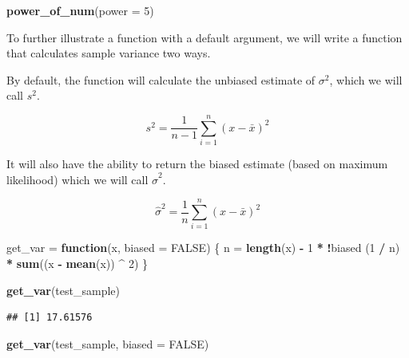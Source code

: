 \documentclass[]{book}
\newenvironment{Shaded}{\begin{snugshade}}{\end{snugshade}}
\newcommand{\KeywordTok}[1]{\textcolor[rgb]{0.13,0.29,0.53}{\textbf{#1}}}
\newcommand{\DataTypeTok}[1]{\textcolor[rgb]{0.13,0.29,0.53}{#1}}
\newcommand{\DecValTok}[1]{\textcolor[rgb]{0.00,0.00,0.81}{#1}}
\newcommand{\StringTok}[1]{\textcolor[rgb]{0.31,0.60,0.02}{#1}}
\newcommand{\OtherTok}[1]{\textcolor[rgb]{0.56,0.35,0.01}{#1}}
\newcommand{\ControlFlowTok}[1]{\textcolor[rgb]{0.13,0.29,0.53}{\textbf{#1}}}
\newcommand{\OperatorTok}[1]{\textcolor[rgb]{0.81,0.36,0.00}{\textbf{#1}}}
\newcommand{\NormalTok}[1]{#1}
\theoremstyle{definition}
\theoremstyle{definition}
\theoremstyle{definition}
\theoremstyle{remark}
\begin{document}
\begin{Shaded}
\begin{Highlighting}[]
\KeywordTok{power_of_num}\NormalTok{(}\DataTypeTok{power =} \DecValTok{5}\NormalTok{)}
\end{Highlighting}
\end{Shaded}

To further illustrate a function with a default argument, we will write
a function that calculates sample variance two ways.

By default, the function will calculate the unbiased estimate of
\(\sigma^2\), which we will call \(s^2\).

\[
s^2 = \frac{1}{n - 1}\sum_{i=1}^{n}(x - \bar{x})^2
\]

It will also have the ability to return the biased estimate (based on
maximum likelihood) which we will call \(\hat{\sigma}^2\).

\[
\hat{\sigma}^2 = \frac{1}{n}\sum_{i=1}^{n}(x - \bar{x})^2
\]

\begin{Shaded}
\begin{Highlighting}[]
\NormalTok{get_var =}\StringTok{ }\ControlFlowTok{function}\NormalTok{(x, }\DataTypeTok{biased =} \OtherTok{FALSE}\NormalTok{) \{}
\NormalTok{  n =}\StringTok{ }\KeywordTok{length}\NormalTok{(x) }\OperatorTok{-}\StringTok{ }\DecValTok{1} \OperatorTok{*}\StringTok{ }\OperatorTok{!}\NormalTok{biased}
\NormalTok{  (}\DecValTok{1} \OperatorTok{/}\StringTok{ }\NormalTok{n) }\OperatorTok{*}\StringTok{ }\KeywordTok{sum}\NormalTok{((x }\OperatorTok{-}\StringTok{ }\KeywordTok{mean}\NormalTok{(x)) }\OperatorTok{^}\StringTok{ }\DecValTok{2}\NormalTok{)}
\NormalTok{\}}
\end{Highlighting}
\end{Shaded}

\begin{Shaded}
\begin{Highlighting}[]
\KeywordTok{get_var}\NormalTok{(test_sample)}
\end{Highlighting}
\end{Shaded}

\begin{verbatim}
## [1] 17.61576
\end{verbatim}

\begin{Shaded}
\begin{Highlighting}[]
\KeywordTok{get_var}\NormalTok{(test_sample, }\DataTypeTok{biased =} \OtherTok{FALSE}\NormalTok{)}
\end{Highlighting}
\end{Shaded}
\end{document}
